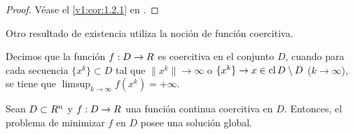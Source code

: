 \begin{proof}
    Véase el \cref{v1:cor:1.2.1} en \cite{izmailov2020otimizacaovolume1}.
\end{proof}

Otro resultado de existencia utiliza la noción de función coercitiva.

\begin{definition}\label{v1:def:1.1.4}
    Decimos que la función $f : D \to R$ es coercitiva en el conjunto $D$, cuando para cada secuencia $\{x^k\} \subset D$ tal que $\|x^k\| \to \infty$ o $\{x^k\} \to x \in \operatorname{cl} D \setminus D$ ($k \to \infty$), se tiene que $\limsup_{k \to \infty} f(x^k) = +\infty$.
\end{definition}

\begin{corollary}\label{v1:cor:1.1.2}
    Sean $D \subset R^n$ y $f : D \to R$ una función continua coercitiva en $D$. Entonces, el problema de minimizar $f$ en $D$ posee una solución global.
\end{corollary}
